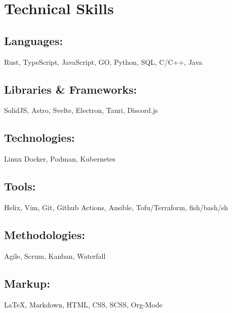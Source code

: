 \section{Technical Skills}

\subsection{Languages:} Rust, TypeScript, JavaScript, GO, Python, SQL, C/C++, Java 
\subsection{Libraries \& Frameworks:} SolidJS, Astro, Svelte, Electron, Tauri, Discord.js
\subsection{Technologies:} Linux Docker, Podman, Kubernetes
\subsection{Tools:} Helix, Vim, Git, Github Actions, Ansible, Tofu/Terraform, fish/bash/sh
\subsection{Methodologies:} Agile, Scrum, Kanban, Waterfall
\subsection{Markup:} {\LaTeX}, Markdown, HTML, CSS, SCSS, Org-Mode
